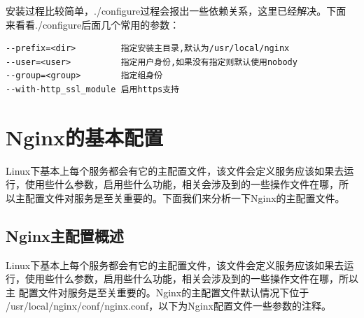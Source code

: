 安装过程比较简单，./configure过程会报出一些依赖关系，这里已经解决。下面
来看看./configure后面几个常用的参数：

\begin{verbatim}
--prefix=<dir>         指定安装主目录,默认为/usr/local/nginx
--user=<user>          指定用户身份,如果没有指定则默认使用nobody
--group=<group>        指定组身份
--with-http_ssl_module 启用https支持
\end{verbatim}

\section{Nginx的基本配置}
\label{subsec:NginxConf}

Linux下基本上每个服务都会有它的主配置文件，该文件会定义服务应该如果去运
行，使用些什么参数，启用些什么功能，相关会涉及到的一些操作文件在哪，所
以主配置文件对服务是至关重要的。下面我们来分析一下Nginx的主配置文件。

\subsection{Nginx主配置概述}

Linux下基本上每个服务都会有它的主配置文件，该文件会定义服务应该如果去运
行，使用些什么参数，启用些什么功能，相关会涉及到的一些操作文件在哪，所以主
配置文件对服务是至关重要的。Nginx的主配置文件默认情况下位于
/usr/local/nginx/conf/nginx.conf，以下为Nginx配置文件一些参数的注释。

